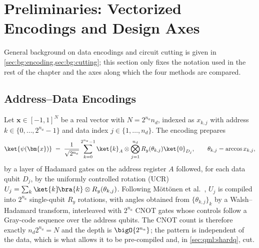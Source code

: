 \section{Preliminaries: Vectorized Encodings and Design Axes}\label{sec:qml:prelim}

General background on data encodings and circuit cutting is given in \cref{sec:bg:encoding,sec:bg:cutting}; this section only fixes the notation used in the rest of the chapter and the axes along which the four methods are compared.

\subsection{Address--Data Encodings}\label{sec:qml:prelim:ucr}

Let $\bm{x} \in [-1,1]^{N}$ be a real vector with $N = 2^{n_a} n_d$, indexed as $x_{k,j}$ with address $k \in \{0,\dots,2^{n_a}-1\}$ and data index $j \in \{1,\dots,n_d\}$. The \qcrank{} encoding \cite{balewski2024qcrank} prepares
\begin{equation}\label{eq:qml:qcrank}
\ket{\psi(\bm{x})} \;=\; \frac{1}{\sqrt{2^{n_a}}} \sum_{k=0}^{2^{n_a}-1} \ket{k}_A \otimes \bigotimes_{j=1}^{n_d} R_y(\theta_{k,j})\ket{0}_{D_j},
\qquad \theta_{k,j} = \arccos x_{k,j},
\end{equation}
by a layer of Hadamard gates on the address register $A$ followed, for each data qubit $D_j$, by the uniformly controlled rotation (UCR) $U_j = \sum_k \ket{k}\!\bra{k} \otimes R_y(\theta_{k,j})$. Following Möttönen et al.~\cite{mottonen2004ucr}, $U_j$ is compiled into $2^{n_a}$ single-qubit $R_y$ rotations, with angles obtained from $\{\theta_{k,j}\}_k$ by a Walsh--Hadamard transform, interleaved with $2^{n_a}$ CNOT gates whose controls follow a Gray-code sequence over the address qubits. The CNOT count is therefore exactly $n_d 2^{n_a} = N$ and the depth is $\bigO{2^{n_a}}$; the pattern is independent of the data, which is what allows it to be pre-compiled and, in \cref{sec:qml:shardq}, cut.

